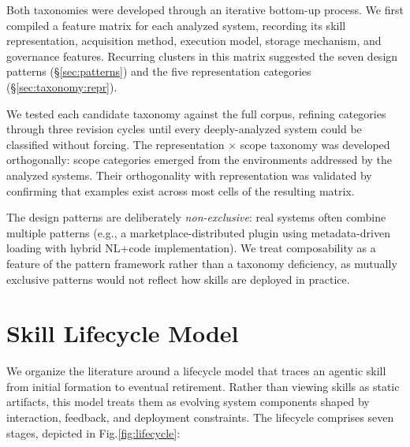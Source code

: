 \documentclass[conference, compsoc]{IEEEtran}
\theoremstyle{plain}
\begin{document}
Both taxonomies were developed through an iterative bottom-up process. We first compiled a feature matrix for each analyzed system, recording its skill representation, acquisition method, execution model, storage mechanism, and governance features. Recurring clusters in this matrix suggested the seven design patterns (\S\ref{sec:patterns}) and the five representation categories (\S\ref{sec:taxonomy:repr}).

We tested each candidate taxonomy against the full corpus, refining categories through three revision cycles until every deeply-analyzed system could be classified without forcing. The representation $\times$ scope taxonomy was developed orthogonally: scope categories emerged from the environments addressed by the analyzed systems. Their orthogonality with representation was validated by confirming that examples exist across most cells of the resulting matrix.

The design patterns are deliberately \emph{non-exclusive}: real systems often combine multiple patterns (e.g., a marketplace-distributed plugin using metadata-driven loading with hybrid NL+code implementation). We treat composability as a feature of the pattern framework rather than a taxonomy deficiency, as mutually exclusive patterns would not reflect how skills are deployed in practice.



\section{Skill Lifecycle Model}
\label{sec:lifecycle}

We organize the literature around a lifecycle model that traces an agentic skill from initial formation to eventual retirement. Rather than viewing skills as static artifacts, this model treats them as evolving system components shaped by interaction, feedback, and deployment constraints. The lifecycle comprises seven stages, depicted in Fig.\ref{fig:lifecycle}:
\end{document}
